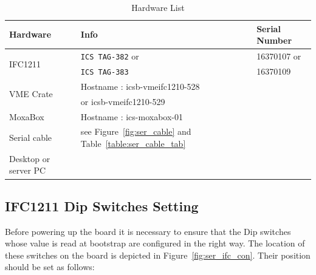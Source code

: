 \documentclass[11pt
  , a4paper
  , article
  , oneside
  , showtrims
]{memoir}
\begin{document}
\begin{table}[!hb]
  \centering
  \begin{tabular}{l|l|l}
    \toprule
    Hardware                  & Info                                                               & Serial Number              \\\midrule
    \multicolumn{1}{l|}{\multirow{2}{*}{IFC1211}}  & \texttt{ICS TAG-382} or                       & 16370107 or                \\
    \multicolumn{1}{l|}{}     & \texttt{ICS TAG-383}                                               & 16370109                   \\\midrule
    \multicolumn{1}{l|}{\multirow{2}{*}{VME Crate}}& Hostname : icsb-vmeifc1210-528                &                            \\
    \multicolumn{1}{l|}{}     & or icsb-vmeifc1210-529                                             &                            \\\midrule
    MoxaBox                   & Hostname : ics-moxabox-01                                          &                            \\\midrule
    Serial cable              & see Figure~\ref{fig:ser_cable} and Table~\ref{table:ser_cable_tab} &                            \\\midrule
    Desktop or server PC      &                                                                    &                            \\\bottomrule
  \end{tabular}
  \caption[]{Hardware List}
  \label{table:hwlist}
\end{table}

\newpage
\subsection{IFC1211 Dip Switches Setting}
Before powering up the board it is necessary to ensure that the Dip switches whose value is read at bootstrap are configured in the right way.
The location of these switches on the board is depicted in Figure~\ref{fig:ser_ifc_con}.
Their position should be set as follows:
\end{document}
